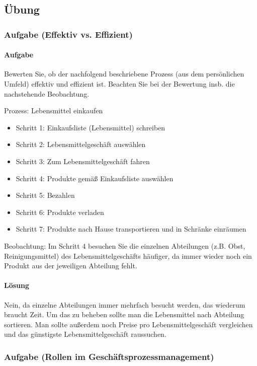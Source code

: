 \subsection{Übung}

\subsubsection*{Aufgabe (Effektiv vs. Effizient)}
\paragraph*{Aufgabe}
    Bewerten Sie, ob der nachfolgend beschriebene Prozess (aus dem persönlichen Umfeld) effektiv und effizient ist. Beachten Sie bei der Bewertung insb. die nachstehende Beobachtung. 

    Prozess: Lebensmittel einkaufen 
    \begin{itemize}
        \item Schritt 1: Einkaufsliste (Lebensmittel) schreiben 
        \item Schritt 2: Lebensmittelgeschäft auswählen
        \item Schritt 3: Zum Lebensmittelgeschäft fahren
        \item Schritt 4: Produkte gemäß Einkaufsliste auswählen 
        \item Schritt 5: Bezahlen 
        \item Schritt 6: Produkte verladen
        \item Schritt 7: Produkte nach Hause transportieren und in Schränke einräumen 
    \end{itemize}

    Beobachtung: Im Schritt 4 besuchen Sie die einzelnen Abteilungen (z.B. Obst, Reinigungsmittel) des Lebensmittelgeschäfts häufiger, da immer wieder noch ein Produkt aus der jeweiligen Abteilung fehlt. 

\paragraph*{Lösung}
    Nein, da einzelne Abteilungen immer mehrfach besucht werden, das wiederum braucht Zeit. Um das zu beheben sollte man die Lebensmittel nach Abteilung sortieren.
    Man sollte außerdem noch Preise pro Lebensmittelgeschäft vergleichen und das günstigste Lebensmittelgeschäft raussuchen.

\subsubsection*{Aufgabe (Rollen im Geschäftsprozessmanagement)}
